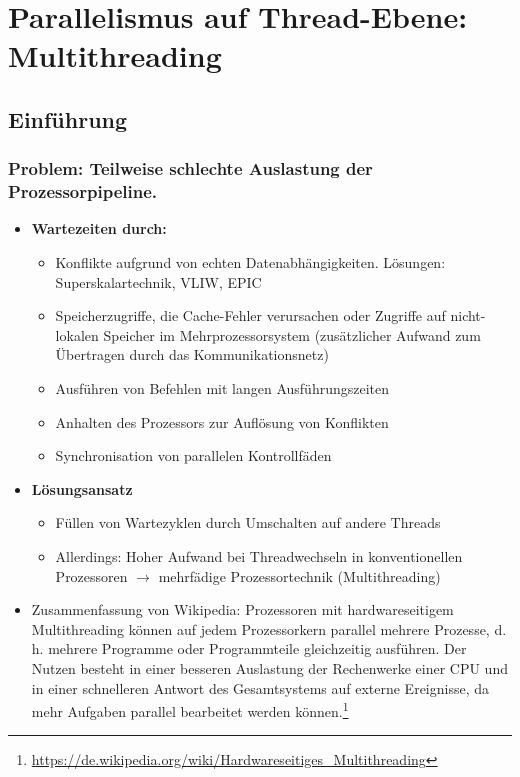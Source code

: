 \section{Parallelismus auf Thread-Ebene: Multithreading}

\subsection{Einführung}

\subsubsection{Problem: Teilweise schlechte Auslastung der Prozessorpipeline.}
\begin{itemize}
	\item \textbf{Wartezeiten durch:}
	\begin{itemize}
		\item Konflikte aufgrund von echten Datenabhängigkeiten. Lösungen: Superskalartechnik, VLIW, EPIC
		\item Speicherzugriffe, die Cache-Fehler verursachen oder Zugriffe auf nicht-lokalen Speicher im Mehrprozessorsystem (zusätzlicher Aufwand zum Übertragen durch das Kommunikationsnetz)
		\item Ausführen von Befehlen mit langen Ausführungszeiten
		\item Anhalten des Prozessors zur Auflösung von Konflikten
		\item Synchronisation von parallelen Kontrollfäden
	\end{itemize}
	\item \textbf{Lösungsansatz}
	\begin{itemize}
		\item Füllen von Wartezyklen durch Umschalten auf andere Threads
		\item Allerdings: Hoher Aufwand bei Threadwechseln in konventionellen Prozessoren \(\rightarrow\) mehrfädige Prozessortechnik (Multithreading)
	\end{itemize}
	\item Zusammenfassung von Wikipedia: Prozessoren mit hardwareseitigem Multithreading können auf jedem Prozessorkern parallel mehrere Prozesse, d. h. mehrere Programme oder Programmteile gleichzeitig ausführen. Der Nutzen besteht in einer besseren Auslastung der Rechenwerke einer CPU und in einer schnelleren Antwort des Gesamtsystems auf externe Ereignisse, da mehr Aufgaben parallel bearbeitet werden können.\footnote{\url{https://de.wikipedia.org/wiki/Hardwareseitiges_Multithreading}}
\end{itemize}

